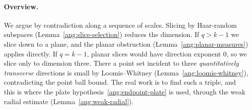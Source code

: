 \paragraph{Overview.} We argue by contradiction along a sequence of scales. Slicing by Haar-random subspaces (Lemma~\ref{ang:slice-selection}) reduces the dimension. If $q>k-1$ we slice down to a plane, and the planar obstruction (Lemma~\ref{ang:planar-measures}) applies directly. If $q=k-1$, planar slices would have direction exponent $0$, so we slice only to dimension three. There a point set incident to three \emph{quantitatively transverse} directions is small by Loomis--Whitney (Lemma~\ref{ang:loomis-whitney}), contradicting the point ball bound. The real work is to find such a triple, and this is where the plate hypothesis~\eqref{ang:endpoint-plate} is used, through the weak radial estimate (Lemma~\ref{ang:weak-radial}).

